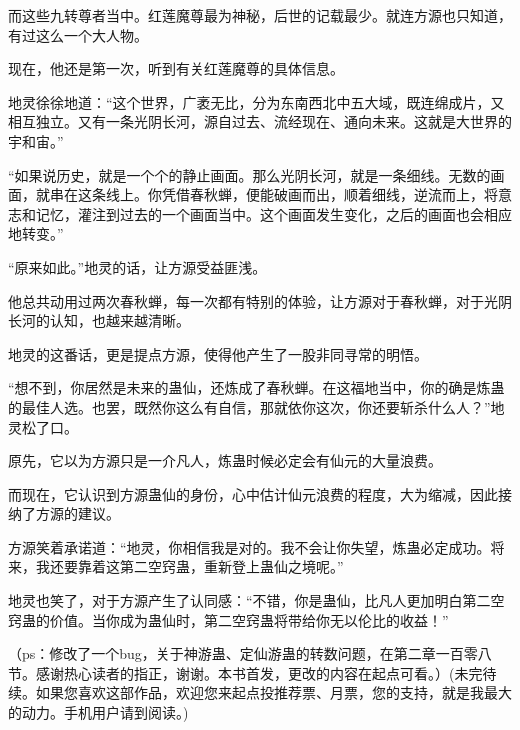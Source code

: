 \begin{this_body}
而这些九转尊者当中。红莲魔尊最为神秘，后世的记载最少。就连方源也只知道，有过这么一个大人物。

现在，他还是第一次，听到有关红莲魔尊的具体信息。

地灵徐徐地道：“这个世界，广袤无比，分为东南西北中五大域，既连绵成片，又相互独立。又有一条光阴长河，源自过去、流经现在、通向未来。这就是大世界的宇和宙。”

“如果说历史，就是一个个的静止画面。那么光阴长河，就是一条细线。无数的画面，就串在这条线上。你凭借春秋蝉，便能破画而出，顺着细线，逆流而上，将意志和记忆，灌注到过去的一个画面当中。这个画面发生变化，之后的画面也会相应地转变。”

“原来如此。”地灵的话，让方源受益匪浅。

他总共动用过两次春秋蝉，每一次都有特别的体验，让方源对于春秋蝉，对于光阴长河的认知，也越来越清晰。

地灵的这番话，更是提点方源，使得他产生了一股非同寻常的明悟。

“想不到，你居然是未来的蛊仙，还炼成了春秋蝉。在这福地当中，你的确是炼蛊的最佳人选。也罢，既然你这么有自信，那就依你这次，你还要斩杀什么人？”地灵松了口。

原先，它以为方源只是一介凡人，炼蛊时候必定会有仙元的大量浪费。

而现在，它认识到方源蛊仙的身份，心中估计仙元浪费的程度，大为缩减，因此接纳了方源的建议。

方源笑着承诺道：“地灵，你相信我是对的。我不会让你失望，炼蛊必定成功。将来，我还要靠着这第二空窍蛊，重新登上蛊仙之境呢。”

地灵也笑了，对于方源产生了认同感：“不错，你是蛊仙，比凡人更加明白第二空窍蛊的价值。当你成为蛊仙时，第二空窍蛊将带给你无以伦比的收益！”

（ps：修改了一个bug，关于神游蛊、定仙游蛊的转数问题，在第二章一百零八节。感谢热心读者的指正，谢谢。本书首发，更改的内容在起点可看。）(未完待续。如果您喜欢这部作品，欢迎您来起点投推荐票、月票，您的支持，就是我最大的动力。手机用户请到阅读。)

\end{this_body}

